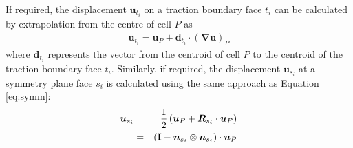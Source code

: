 \documentclass[sn-mathphys,Numbered]{sn-jnl}%
\newcommand{\bb}{\boldsymbol}
\begin{document}
If required, the displacement $\bb{u}_{t_i}$ on a traction boundary face $t_i$ can be calculated by extrapolation from the centre of cell $P$ as
\begin{eqnarray}
	\bb{u}_{t_i} = \bb{u}_P + \bb{d}_{t_i} \cdot \left(\bb{\nabla} \bb{u} \right)_P
\end{eqnarray}
where $\bb{d}_{t_i}$ represents the vector from the centroid of cell $P$ to the centroid of the traction boundary face $t_i$.
Similarly, if required, the displacement $\bb{u}_{s_i}$ at a symmetry plane face $s_i$ is calculated using the same approach as Equation \ref{eq:symm}:
\begin{eqnarray} 
	\bb{u}_{s_i}
		&=&  \frac{1}{2} \left( \bb{u}_P + \bb{R}_{s_i} \cdot \bb{u}_P \right) \notag \\
		&=& \left (\textbf{I} - \bb{n}_{s_i} \otimes \bb{n}_{s_i} \right) \cdot \bb{u}_P
\end{eqnarray}
\end{document}
